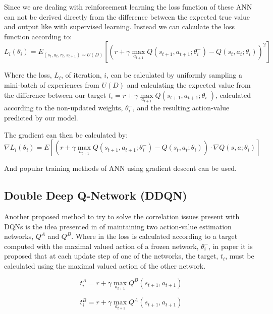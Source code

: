 Since we are dealing with reinforcement learning the loss function of these ANN can not be derived directly from the difference between the expected true value and output like with supervised learning. Instead we can calculate the loss function according to:
\begin{equation}
    L_i(\theta_i) = E_{(s_t, a_t, r_t, s_{t+1})\sim U(D)} [(r+\gamma \max\limits_{a_{t+1}} Q(s_{t+1}, a_{t+1};\theta_i^-) - Q(s_t, a_t; \theta_i))^2]
\end{equation}

Where the loss, $L_i$, of iteration, $i$, can be calculated by uniformly sampling a mini-batch of experiences from $U(D)$ and calculating the expected value from the difference between our target $t_i=r+\gamma\max\limits_{a_{t+1}} Q(s_{t+1}, a_{t+1};\theta_i^-)$, calculated according to the non-updated weights, $\theta_i^-$, and the resulting action-value predicted by our model.

The gradient can then be calculated by:
\begin{equation}
\nabla L_i(\theta_i) = E [(r+\gamma \max\limits_{a_{t+1}} Q(s_{t+1}, a_{t+1};\theta_i^-) - Q(s_t, a_t; \theta_i))\cdot\nabla Q(s, a;\theta_i)]
\end{equation}

And popular training methods of ANN using gradient descent can be used.

\subsection{Double Deep Q-Network (DDQN)}
\noindent Another proposed method to try to solve the correlation issues present with \acrshort{DQN}s is the idea presented in \cite{doubleDQN} of maintaining two action-value estimation networks, $Q^A$ and $Q^B$. Where in \cite{DQN} the loss is calculated according to a target computed with the maximal valued action of a frozen network, $\theta_i^-$, in paper \cite{doubleDQN} it is proposed that at each update step of one of the networks, the target, $t_i$, must be calculated using the maximal valued action of the other network.

\begin{equation}
    t_i^A = r+\gamma\max\limits_{a_{t+1}}Q^B(s_{t+1}, a_{t+1})
\end{equation}

\begin{equation}
    t_i^B = r+\gamma\max\limits_{a_{t+1}}Q^A(s_{t+1}, a_{t+1})
\end{equation}

